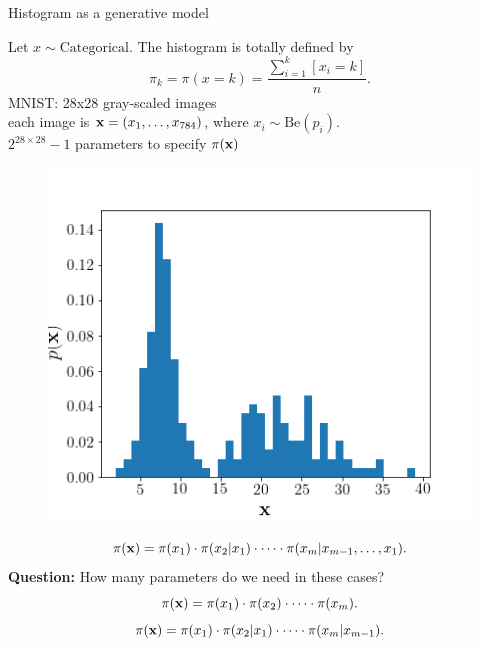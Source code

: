 \begin{frame}{Histogram as a generative model}
	
	\begin{minipage}[t]{0.6\columnwidth}
	    Let $x \sim \text{Categorical}$. The histogram is totally defined by
		\[
		    \pi_k = \pi(x = k) = \frac{\sum_{i=1}^k [x_i = k]}{n}.
		\]
		MNIST: 28x28 gray-scaled images \\
		each image is $\mathbf{x} = (x_1, \dots, x_{784})$, where $x_i \sim \text{Be}(p_i)$. \\
		$2^{28\times28} - 1$ parameters to specify $\pi(\mathbf{x})$ 
		\end{minipage}%
		\begin{minipage}[t]{0.4\columnwidth}
	    \begin{figure}[h]
	        \centering
	        \includegraphics[width=\linewidth]{figs/histogram.png}
	    \end{figure}
	\end{minipage}
	\[
	    \pi(\mathbf{x}) = \pi(x_1) \cdot \pi(x_2 | x_1) \cdot \dots \cdot \pi(x_m | x_{m-1}, \dots, x_1).
	\]
	\textbf{Question:} How many parameters do we need in these cases?
	\[
	    \pi(\mathbf{x}) = \pi(x_1) \cdot \pi(x_2)\cdot \dots \cdot \pi(x_m).
	\]
	\[
	    \pi(\mathbf{x}) = \pi(x_1) \cdot \pi(x_2 | x_1) \cdot \dots \cdot \pi(x_m | x_{m-1}).
	\]
\end{frame}
